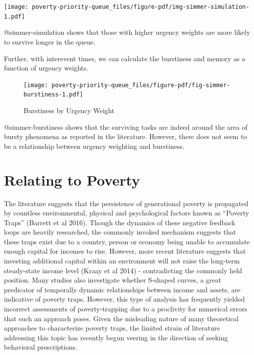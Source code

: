 \documentclass[
]{report}
\begin{document}
\texttt{[image: poverty-priority-queue\_files/figure-pdf/img-simmer-simulation-1.pdf]}

@simmer-simulation shows that those with higher urgency weights are more
likely to survive longer in the queue.

Further, with interevent times, we can calculate the burstiness and
memory as a function of urgency weights.

\begin{figure}

{\centering \texttt{[image: poverty-priority-queue\_files/figure-pdf/fig-simmer-burstiness-1.pdf]}

}

\caption{\label{fig-simmer-burstiness}Burstiness by Urgency Weight}

\end{figure}

@simmer-burstiness shows that the surviving tasks are indeed around the
area of bursty phenomena as reported in the literature. However, there
does not seem to be a relationship between urgency weighting and
burstiness.

\hypertarget{sec-poverty}{%
\section{Relating to Poverty}\label{sec-poverty}}

The literature suggests that the persistence of generational poverty is
propagated by countless environmental, physical and psychological
factors known as ``Poverty Traps'' (Barrett et al 2016). Though the
dynamics of these negative feedback loops are heavily researched, the
commonly invoked mechanism suggests that these traps exist due to a
country, person or economy being unable to accumulate enough capital for
incomes to rise. However, more recent literature suggests that investing
additional capital within an environment will not raise the long-term
steady-state income level (Kraay et al 2014) - contradicting the
commonly held position. Many studies also investigate whether S-shaped
curves, a great predicator of temporally dynamic relationships between
income and assets, are indicative of poverty traps. However, this type
of analysis has frequently yielded incorrect assessments of
poverty-trapping due to a proclivity for numerical errors that such an
approach poses. Given the misleading nature of many theoretical
approaches to characterize poverty traps, the limited strain of
literature addressing this topic has recently begun veering in the
direction of seeking behavioral prescriptions.
\end{document}
